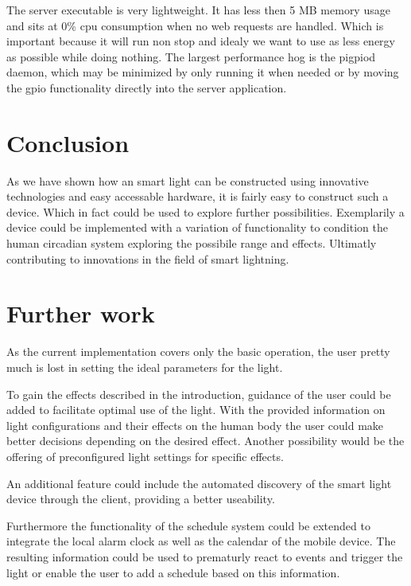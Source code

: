 \documentclass[conference]{IEEEtran}
\begin{document}
The server executable is very lightweight. It has less then 5 MB memory usage and sits at 0\% cpu consumption when no web
requests are handled. Which is important because it will run non stop and idealy we want to use as less energy as possible while
doing nothing. The largest performance hog is the pigpiod daemon, which may be minimized by only running it when needed or by moving
the gpio functionality directly into the server application. 


\section{Conclusion}
As we have shown how an smart light can be constructed using innovative technologies and easy accessable hardware, it is fairly
easy to construct such a device. Which in fact could be used to explore further possibilities. Exemplarily a device could be
implemented with a variation of functionality to condition the human circadian system exploring the possibile range and effects.
Ultimatly contributing to innovations in the field of smart lightning.


\section{Further work}
As the current implementation covers only the basic operation, the user pretty much is lost in setting the ideal parameters
for the light.

To gain the effects described in the introduction, guidance of the user could be added to facilitate
optimal use of the light. With the provided information on light configurations and their effects on the human body
the user could make better decisions depending on the desired effect. Another possibility would be the offering of preconfigured
light settings for specific effects.

An additional feature could include the automated discovery of the smart light device through the client, providing a 
better useability. 

Furthermore the functionality of the schedule system could be extended to integrate the local alarm clock as well as the calendar
of the mobile device. The resulting information could be used to prematurly react to events and trigger the light or enable the user
to add a schedule based on this information. 




\end{document}
